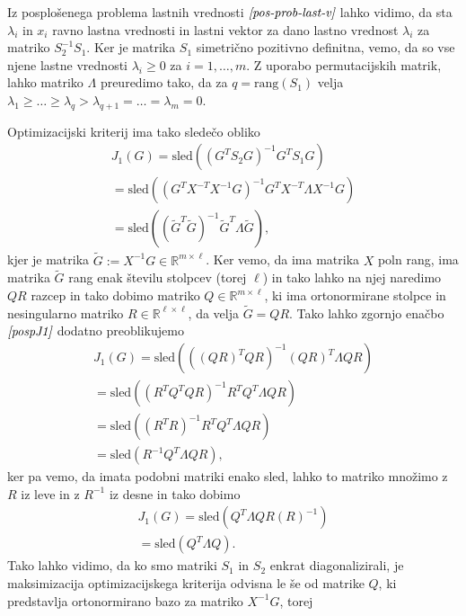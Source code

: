 \documentclass[mat1]{article}
\theoremstyle{definition}
\begin{document}
Iz posplošenega problema lastnih vrednosti $\textit{\eqref{pos-prob-last-v}}$ lahko vidimo, da sta $\lambda_i$ in $x_i$ ravno lastna vrednosti in lastni vektor za dano lastno vrednost $\lambda_i$ za matriko $S_2^{-1} S_1$. Ker je matrika $S_1$ simetrično pozitivno definitna, vemo, da so vse njene lastne vrednosti $\lambda_i \geq 0$ za $i = 1, \ldots, m$. Z uporabo permutacijskih matrik, lahko matriko $\Lambda$ preuredimo tako, da za  $q = \text{rang} \left( S_1 \right)$ velja $\lambda_1 \geq \ldots \geq \lambda_q > \lambda_{q+1} = \ldots = \lambda_m = 0$.

Optimizacijski kriterij ima tako sledečo obliko
\begin{equation} \label{pospJ1}
\begin{split}
J_1\left(G\right)
=
\text{sled} \left( (G^T S_2 G)^{-1} G^T S_1 G \right)
\\
=
\text{sled} \left( (G^T X^{-T}X^{-1} G)^{-1} G^T X^{-T} \Lambda X^{-1} G \right)
\\
= 
\text{sled} \left( (\tilde{G}^T \tilde{G})^{-1} \tilde{G}^T \Lambda \tilde{G} \right)
\text{,}
\end{split}
\end{equation}
kjer je matrika $\tilde{G} := X^{-1} G \in \mathbb{R}^{m \times \ell}$. Ker vemo, da ima matrika $X$ poln rang, ima matrika $\tilde{G}$ rang enak številu stolpcev (torej $\ell$) in tako lahko na njej naredimo $QR$ razcep in tako dobimo matriko $Q \in \mathbb{R}^{m \times \ell}$, ki ima ortonormirane stolpce in nesingularno matriko $R \in \mathbb{R}^{\ell \times \ell}$, da velja $\tilde{G} = QR$. Tako lahko zgornjo enačbo $\textit{\eqref{pospJ1}}$ dodatno preoblikujemo
\begin{align*}
J_1(G)
=
\text{sled} \left( ((QR)^T QR)^{-1} (QR)^T \Lambda QR \right)
\\
=
\text{sled} \left( (R^T Q^T QR)^{-1} R^T Q^T \Lambda QR \right)
\\
=
\text{sled} \left( (R^T R)^{-1} R^T Q^T \Lambda QR \right)
\\
=
\text{sled} \left( R^{-1} Q^T \Lambda QR \right)
\text{,}
\end{align*}
ker pa vemo, da imata podobni matriki enako sled, lahko to matriko množimo z $R$ iz leve in z $R^{-1}$ iz desne in tako dobimo
\begin{align*}
J_1(G)
=
\text{sled} \left(Q^T \Lambda QR  (R)^{-1} \right)
\\
=
\text{sled} \left(Q^T \Lambda Q \right)
\text{.}
\end{align*}
Tako lahko vidimo, da ko smo matriki $S_1$ in $S_2$ enkrat diagonalizirali, je maksimizacija optimizacijskega kriterija odvisna le še od matrike $Q$, ki predstavlja ortonormirano bazo za matriko $X^{-1} G$, torej
\end{document}
